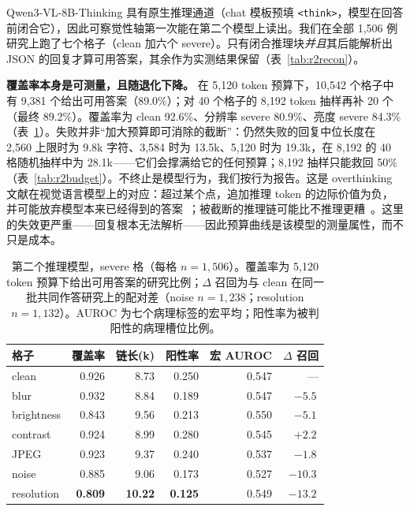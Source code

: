 Qwen3-VL-8B-Thinking 具有原生推理通道（chat 模板预填 \texttt{<think>}，模型在回答前闭合它），因此可察觉性轴第一次能在第二个模型上读出。我们在全部 1,506 例研究上跑了七个格子（clean 加六个 severe）。只有闭合推理块\emph{并且}其后能解析出 JSON 的回复才算可用答案，其余作为实测结果保留（表~\ref{tab:r2recon}）。

\textbf{覆盖率本身是可测量，且随退化下降。} 在 5,120 token 预算下，10,542 个格子中有 9,381 个给出可用答案（89.0\%）；对 40 个格子的 8,192 token 抽样再补 20 个（最终 89.2\%）。覆盖率为 clean 92.6\%、分辨率 severe 80.9\%、亮度 severe 84.3\%（表~\ref{tab:r2think}）。失败并非``加大预算即可消除的截断''：仍然失败的回复中位长度在 2,560 上限时为 9.8k 字符、3,584 时为 13.5k、5,120 时为 19.3k，在 8,192 的 40 格随机抽样中为 28.1k——它们会撑满给它的任何预算；8,192 抽样只能救回 50\%（表~\ref{tab:r2budget}）。不终止是模型行为，我们按行为报告。这是 overthinking 文献在视觉语言模型上的对应：超过某个点，追加推理 token 的边际价值为负，并可能放弃模型本来已经得到的答案~\citep{wu2026whenmore,zhou2026overthinking}；被截断的推理链可能比不推理更糟~\citep{su2026broken}。这里的失效更严重——回复根本无法解析——因此预算曲线是该模型的测量属性，而不只是成本。

\begin{table}[t]
\centering
\footnotesize
\setlength{\tabcolsep}{3.5pt}
\caption{第二个推理模型，severe 格（每格 $n=1{,}506$）。覆盖率为 5,120 token 预算下给出可用答案的研究比例；$\Delta$ 召回为与 clean 在同一批共同作答研究上的配对差（noise $n=1{,}238$；resolution $n=1{,}132$）。AUROC 为七个病理标签的宏平均；阳性率为被判阳性的病理槽位比例。}
\label{tab:r2think}
\begin{tabular}{lrrrrr}
\toprule
格子 & 覆盖率 & 链长(k) & 阳性率 & 宏 AUROC & $\Delta$ 召回 \\
\midrule
clean & 0.926 & 8.73 & 0.250 & 0.547 & --- \\
blur & 0.932 & 8.84 & 0.189 & 0.547 & $-5.5$\,\pp{} \\
brightness & 0.843 & 9.56 & 0.213 & 0.550 & $-5.1$\,\pp{} \\
contrast & 0.924 & 8.99 & 0.280 & 0.545 & $+2.2$\,\pp{} \\
JPEG & 0.923 & 9.37 & 0.240 & 0.537 & $-1.8$\,\pp{} \\
noise & 0.885 & 9.06 & 0.173 & 0.527 & $\mathbf{-10.3}$\,\pp{} \\
resolution & \textbf{0.809} & \textbf{10.22} & \textbf{0.125} & 0.549 & $\mathbf{-13.2}$\,\pp{} \\
\bottomrule
\end{tabular}
\end{table}

